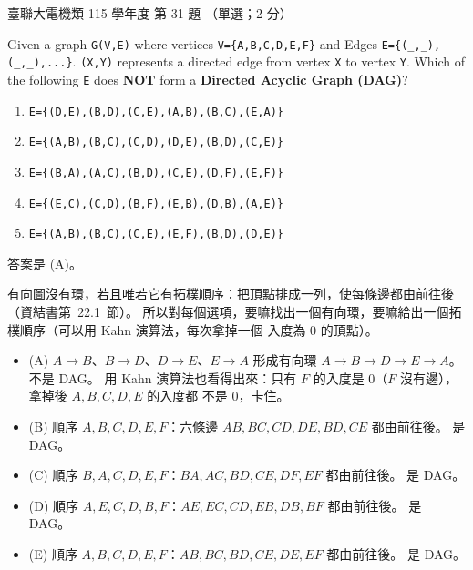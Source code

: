 \begin{pastexam}[label={px:ust-115-ee-ds-31}]{臺聯大電機類 115 學年度 第 31 題}
（單選；2 分）

Given a graph \texttt{G(V,E)} where vertices \texttt{V=\{A,B,C,D,E,F\}} and Edges
\texttt{E=\{(\_,\_),(\_,\_),...\}}. \texttt{(X,Y)} represents a directed edge from vertex \texttt{X}
to vertex \texttt{Y}. Which of the following \texttt{E} does \textbf{NOT} form a \textbf{Directed
Acyclic Graph (DAG)}?
\begin{enumerate}[label=(\Alph*)]
\item \texttt{E=\{(D,E),(B,D),(C,E),(A,B),(B,C),(E,A)\}}
\item \texttt{E=\{(A,B),(B,C),(C,D),(D,E),(B,D),(C,E)\}}
\item \texttt{E=\{(B,A),(A,C),(B,D),(C,E),(D,F),(E,F)\}}
\item \texttt{E=\{(E,C),(C,D),(B,F),(E,B),(D,B),(A,E)\}}
\item \texttt{E=\{(A,B),(B,C),(C,E),(E,F),(B,D),(D,E)\}}
\end{enumerate}
\end{pastexam}

\begin{pastsoln}
答案是 (A)。

有向圖沒有環，若且唯若它有拓樸順序：把頂點排成一列，使每條邊都由前往後（資結書第~22.1~節）。
所以對每個選項，要嘛找出一個有向環，要嘛給出一個拓樸順序（可以用 Kahn 演算法，每次拿掉一個
入度為 $0$ 的頂點）。
\begin{itemize}
\item (A) $A \to B$、$B \to D$、$D \to E$、$E \to A$ 形成有向環 $A \to B \to D \to E \to A$。 不是 DAG。
用 Kahn 演算法也看得出來：只有 $F$ 的入度是 $0$（$F$ 沒有邊），拿掉後 $A, B, C, D, E$ 的入度都
不是 $0$，卡住。
\item (B) 順序 $A, B, C, D, E, F$：六條邊 $AB, BC, CD, DE, BD, CE$ 都由前往後。 是 DAG。
\item (C) 順序 $B, A, C, D, E, F$：$BA, AC, BD, CE, DF, EF$ 都由前往後。 是 DAG。
\item (D) 順序 $A, E, C, D, B, F$：$AE, EC, CD, EB, DB, BF$ 都由前往後。 是 DAG。
\item (E) 順序 $A, B, C, D, E, F$：$AB, BC, BD, CE, DE, EF$ 都由前往後。 是 DAG。
\end{itemize}
\end{pastsoln}
